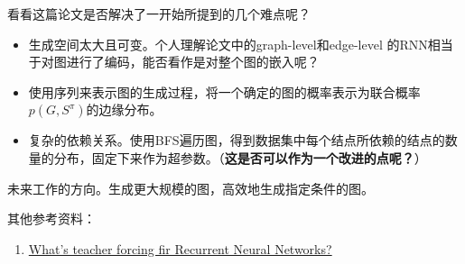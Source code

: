 \par 看看这篇论文是否解决了一开始所提到的几个难点呢？
\begin{itemize}
    \item 生成空间太大且可变。个人理解论文中的graph-level和edge-level 的RNN相当于对图进行了编码，能否看作是对整个图的嵌入呢？
    \item 使用序列来表示图的生成过程，将一个确定的图的概率表示为联合概率$p(G, S^{\pi})$的边缘分布。
    \item 复杂的依赖关系。使用BFS遍历图，得到数据集中每个结点所依赖的结点的数量的分布，固定下来作为超参数。（\textbf{{\color{red}这是否可以作为一个改进的点呢？}}）
\end{itemize}

\par 未来工作的方向。生成更大规模的图，高效地生成指定条件的图。

其他参考资料：
\begin{enumerate}
    \item \href{https://machinelearningmastery.com/teacher-forcing-for-recurrent-neural-networks/}{What's teacher forcing fir Recurrent Neural Networks?}
\end{enumerate}
